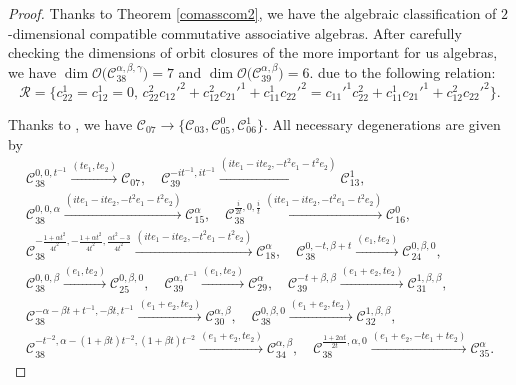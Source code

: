 \documentclass[10pt,a4paper]{amsart}
\numberwithin{equation}{section}
\begin{document}
\begin{proof}
 Thanks to Theorem \ref{comasscom2}, we have the algebraic classification of
 $2$-dimensional compatible commutative associative algebras.
After carefully checking the dimensions of orbit closures of the more important for us algebras, we have
$\dim \mathcal{O}\bigl(\mathcal{C}_{38}^{\alpha,\beta,\gamma}\bigr) = 7 $ and $ \dim \mathcal{O}\bigl(\mathcal{C}_{39}^{\alpha,\beta}\bigr) = 6$.
 due to the following relation:
\[
\mathcal R=\big\{
c_{22}^1=c_{12}^1=0,\,
c_{22}^2 c_{12}'^2 + c_{12}^2 c_{21}'^1 + c_{11}^1 c_{22}'^2 = c_{11}'^1 c_{22}^2 + c_{11}^1 c_{21}'^1 + c_{12}^2 c_{22}'^2\big\}.
\]

Thanks to \cite{KV}, we have
$\mathcal{C}_{07} \to \big\{\mathcal{C}_{03}, \mathcal{C}_{05}^0, \mathcal{C}_{06}^1\big\}.$ All necessary degenerations are given by
\begin{gather*}
 \mathcal{C}_{38}^{0, 0, t^{-1}} \xrightarrow{ (te_1, t e_2)} \mathcal{C}_{07} ,\quad
 \mathcal{C}_{39}^{-it^{-1}, it^{-1}} \xrightarrow{ (i te_1-i te_2, -t^2e_1-t^2e_2)} \mathcal{C}_{13}^{1} , \\
 \mathcal{C}_{38}^{0, 0, \alpha} \xrightarrow{ (i te_1-i te_2, -t^2e_1-t^2e_2)} \mathcal{C}_{15}^{\alpha} ,\quad
 \mathcal{C}_{38}^{\frac{i}{2t}, 0, \frac{i}{t}} \xrightarrow{ (i te_1-i te_2, -t^2e_1-t^2e_2)} \mathcal{C}_{16}^{0} , \\
 \mathcal{C}_{38}^{-\frac{1+\alpha t^2}{4 t^2}, -\frac{1+\alpha t^2}{4 t^2}, \frac{\alpha t^2-3}{4t^2}} \xrightarrow{ (i te_1-i t e_2, -t^2e_1-t^2e_2)} \mathcal{C}_{18}^{\alpha} ,\quad \mathcal{C}_{38}^{0, -t, \beta+t} \xrightarrow{ (e_1, te_2)} \mathcal{C}_{24}^{0,\beta,0} , \\
 \mathcal{C}_{38}^{0, 0, \beta} \xrightarrow{ (e_1, te_2)} \mathcal{C}_{25}^{0,\beta,0} ,\quad
 \mathcal{C}_{39}^{\alpha, t^{-1}} \xrightarrow{ (e_1, te_2)} \mathcal{C}_{29}^{\alpha} , \quad \mathcal{C}_{39}^{-t+\beta, \beta} \xrightarrow{ (e_1+e_2, te_2)} \mathcal{C}_{31}^{1,\beta,\beta} ,\\
 \mathcal{C}_{38}^{-\alpha-\beta t +t^{-1}, - \beta t , t^{-1}} \xrightarrow{ (e_1+e_2, te_2)} \mathcal{C}_{30}^{\alpha, \beta} ,\quad \mathcal{C}_{38}^{0, \beta, 0} \xrightarrow{ (e_1+e_2, te_2)} \mathcal{C}_{32}^{1, \beta, \beta} , \\
 \mathcal{C}_{38}^{-t^{-2}, \alpha -(1+\beta t)t^{-2}, (1+\beta t)t^{-2}} \xrightarrow{ (e_1+e_2, te_2)} \mathcal{C}_{34}^{\alpha, \beta} , \quad \mathcal{C}_{38}^{\frac{1+2\alpha t}{2t}, \alpha, 0} \xrightarrow{ (e_1+e_2, -te_1+te_2)} \mathcal{C}_{35}^{\alpha}.\tag*{\qed}
 \end{gather*}\renewcommand{\qed}{}
\end{proof}
\end{document}
